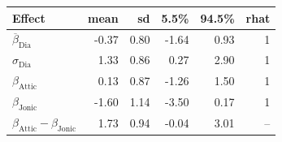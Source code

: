 
\begin{tabular}[t]{lrrrrr}
\toprule
Effect & mean & sd & 5.5\% & 94.5\% & rhat\\
\midrule
$\overline{\beta}_{\text{Dia}}$ & -0.37 & 0.80 & -1.64 & 0.93 & 1\\
$\sigma_{\text{Dia}}$ & 1.33 & 0.86 & 0.27 & 2.90 & 1\\
$\beta_{\text{Attic}}$ & 0.13 & 0.87 & -1.26 & 1.50 & 1\\
$\beta_{\text{Jonic}}$ & -1.60 & 1.14 & -3.50 & 0.17 & 1\\
$\beta_{\text{Attic}} - \beta_{\text{Jonic}}$ & 1.73 & 0.94 & -0.04 & 3.01 & --\\
\bottomrule
\end{tabular}
